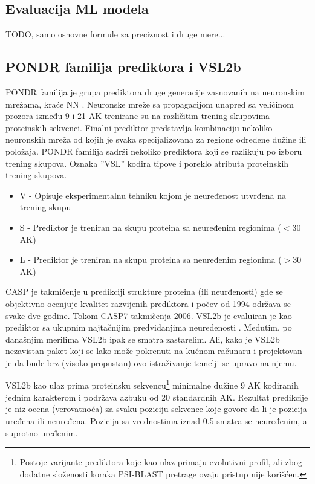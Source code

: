 \subsection{Evaluacija ML modela}
TODO, samo osnovne formule za preciznost i druge mere...


\subsection{PONDR familija prediktora i VSL2b}
\label{VSL2b}

PONDR familija  je grupa
prediktora druge generacije zasnovanih na neuronskim mrežama, kraće NN .
Neuronske mreže sa propagacijom unapred  sa veličinom
prozora između 9 i 21 AK trenirane su na različitim trening skupovima
proteinskih sekvenci.  Finalni prediktor predstavlja kombinaciju nekoliko
neuronskih mreža od kojih je svaka specijalizovana za regione određene dužine
ili položaja.  PONDR familija sadrži nekoliko prediktora koji  se razlikuju 
po izboru trening skupova.
Oznaka ''VSL'' kodira tipove i poreklo atributa proteinskih trening skupova.
\begin{itemize}
  \item V - Opisuje eksperimentalnu tehniku kojom je neuređenost utvrđena na
    trening skupu 
  \item S - Prediktor je treniran na skupu proteina sa 
      neuređenim regionima ($<30$ AK)
  \item L - Prediktor je treniran na skupu proteina sa 
    neuređenim regionima ($>30$ AK)
\end{itemize}

CASP  je takmičenje u
predikciji strukture proteina (ili neurđenosti) gde se objektivno ocenjuje
kvalitet razvijenih prediktora i počev od 1994 održava se svake dve godine.
Tokom CASP7 takmičenja 2006. VSL2b je evaluiran je kao prediktor sa ukupnim
najtačnijim predviđanjima neuređenosti \parencite{He2009}. Međutim, po
današnjim merilima \parencite{Meng2017} VSL2b ipak se smatra zastarelim.  Ali,
kako je VSL2b nezavistan paket koji se lako može pokrenuti na kućnom računaru i
projektovan je da bude brz (visoko propustan) ovo istraživanje temelji se
upravo na njemu.

VSL2b kao ulaz prima proteinsku sekvencu\footnote{
  Postoje varijante prediktora koje kao ulaz primaju evolutivni profil, ali zbog
  dodatne složenosti koraka PSI-BLAST pretrage ovaju pristup nije korišćen.
}
minimalne dužine 9 AK kodiranih jednim
karakterom i podržava azbuku od 20 standardnih AK. Rezultat predikcije je niz
ocena (verovatnoća) za svaku poziciju sekvence
koje govore da li je pozicija uređena ili neuređena. Pozicija sa vrednostima iznad
0.5 smatra se neuređenim, a suprotno uređenim.





